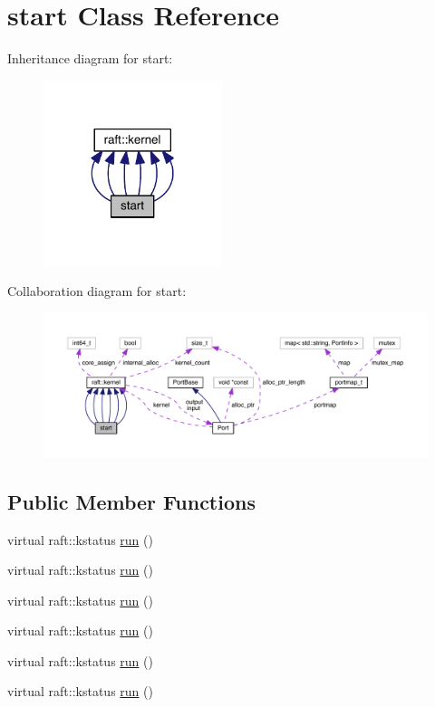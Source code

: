 \hypertarget{classstart}{}\section{start Class Reference}
\label{classstart}


Inheritance diagram for start\+:
\nopagebreak
\begin{figure}[H]
\begin{center}
\leavevmode
\includegraphics[width=148pt]{classstart__inherit__graph}
\end{center}
\end{figure}


Collaboration diagram for start\+:
\nopagebreak
\begin{figure}[H]
\begin{center}
\leavevmode
\includegraphics[width=350pt]{classstart__coll__graph}
\end{center}
\end{figure}
\subsection*{Public Member Functions}
\begin{DoxyCompactItemize}
\item 
virtual raft\+::kstatus \hyperlink{classstart_a4c076d756e2846f51e54452853a9ed6d}{run} ()
\item 
virtual raft\+::kstatus \hyperlink{classstart_a4c076d756e2846f51e54452853a9ed6d}{run} ()
\item 
virtual raft\+::kstatus \hyperlink{classstart_a4c076d756e2846f51e54452853a9ed6d}{run} ()
\item 
virtual raft\+::kstatus \hyperlink{classstart_a4c076d756e2846f51e54452853a9ed6d}{run} ()
\item 
virtual raft\+::kstatus \hyperlink{classstart_a4c076d756e2846f51e54452853a9ed6d}{run} ()
\item 
virtual raft\+::kstatus \hyperlink{classstart_a4c076d756e2846f51e54452853a9ed6d}{run} ()
\end{DoxyCompactItemize}
